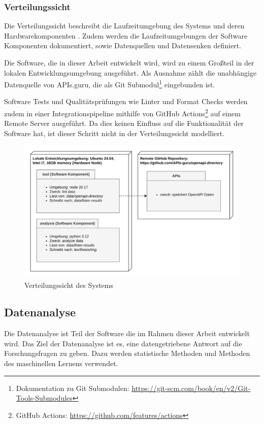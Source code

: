 \subsubsection{Verteilungssicht} \label{sec:verteilungssicht}
Die Verteilungssicht beschreibt die Laufzeitumgebung des Systems und deren Hardwarekomponenten \parencite{starke_effektive_2024}. Zudem werden die Laufzeitumgebungen der Software Komponenten dokumentiert, sowie Datenquellen und Datensenken definiert. 

Die Software, die in dieser Arbeit entwickelt wird, wird zu einem Großteil in der lokalen Entwicklungsumgebung ausgeführt. Als Ausnahme zählt die unabhängige Datenquelle von APIs.guru, die als Git Submodul\footnote{Dokumentation zu Git Submodulen: \href{https://git-scm.com/book/en/v2/Git-Tools-Submodules}{https://git-scm.com/book/en/v2/Git-Tools-Submodules}} eingebunden ist.

Software Tests und Qualitätsprüfungen wie Linter und Format Checks werden zudem in einer Integrationspipeline mithilfe von GitHub Actions\footnote{GitHub Actions: \href{https://github.com/features/actions}{https://github.com/features/actions}} auf einem Remote Server ausgeführt. Da dies keinen Einfluss auf die Funktionalität der Software hat, ist dieser Schritt nicht in der Verteilungssicht modelliert.

\newpage
\begin{figure}[htbp]
  \centering
  \includegraphics[width=1\linewidth]{img/deploymentview.png} \caption{Verteilungssicht des Systems}
  \label{fig:Verteilungssicht}
\end{figure}


\subsection{Datenanalyse} \label{sec:datenanalyse}
\label{chapter:dataanalysis}
Die Datenanalyse ist Teil der Software die im Rahmen dieser Arbeit entwickelt wird. Das Ziel der Datenanalyse ist es, eine datengetriebene Antwort auf die Forschungsfragen zu geben. Dazu werden statistische Methoden und Methoden des maschinellen Lernens verwendet.

